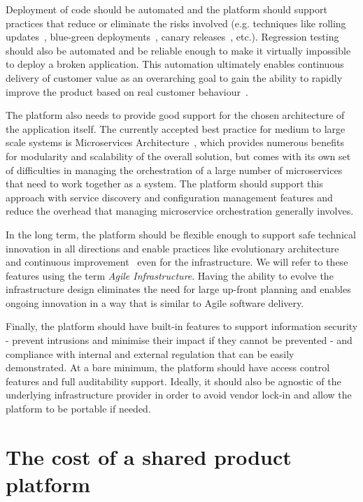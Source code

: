\documentclass[reprint,amsmath,amssymb,aps]{revtex4-1}
\begin{document}
Deployment of code should be automated and the platform should support practices that reduce or eliminate the risks involved (e.g. techniques like rolling updates~\cite{Performi30:online}, blue-green deployments~\cite{BlueGree26:online}, canary releases~\cite{CanaryRe28:online}, etc.). Regression testing should also be automated and be reliable enough to make it virtually impossible to deploy a broken application. This automation ultimately enables continuous delivery of customer value as an overarching goal to gain the ability to rapidly improve the product based on real customer behaviour~\cite{Continuo59:online}.

The platform also needs to provide good support for the chosen architecture of the application itself. The currently accepted best practice for medium to large scale systems is Microservices Architecture~\cite{Microser99:online}, which provides numerous benefits for modularity and scalability of the overall solution, but comes with its own set of difficulties in managing the orchestration of a large number of microservices that need to work together as a system. The platform should support this approach with service discovery and configuration management features and reduce the overhead that managing microservice orchestration generally involves.

In the long term, the platform should be flexible enough to support safe technical innovation in all directions and enable practices like evolutionary architecture~\cite{Microser21:online} and continuous improvement~\cite{KaizenTh68:online} even for the infrastructure. We will refer to these features using the term \textit{Agile Infrastructure}. Having the ability to evolve the infrastructure design eliminates the need for large up-front planning and enables ongoing innovation in a way that is similar to Agile software delivery.

Finally, the platform should have built-in features to support information security - prevent intrusions and minimise their impact if they cannot be prevented - and compliance with internal and external regulation that can be easily demonstrated. At a bare minimum, the platform should have access control features and full auditability support. Ideally, it should also be agnostic of the underlying infrastructure provider in order to avoid vendor lock-in and allow the platform to be portable if needed.


\section{The cost of a shared product platform}
\label{sec:cost}
\end{document}
